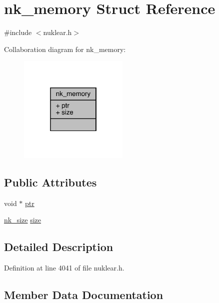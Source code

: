 \hypertarget{structnk__memory}{}\section{nk\+\_\+memory Struct Reference}
\label{structnk__memory}


{\ttfamily \#include $<$nuklear.\+h$>$}



Collaboration diagram for nk\+\_\+memory\+:
\nopagebreak
\begin{figure}[H]
\begin{center}
\leavevmode
\includegraphics[width=148pt]{structnk__memory__coll__graph}
\end{center}
\end{figure}
\subsection*{Public Attributes}
\begin{DoxyCompactItemize}
\item 
void $\ast$ \mbox{\hyperlink{structnk__memory_a844a5bebb33c6e11678e4e1ad5a9762c}{ptr}}
\item 
\mbox{\hyperlink{nuklear_8h_a84c0fc50dec5501be327b33d41d9010c}{nk\+\_\+size}} \mbox{\hyperlink{structnk__memory_a02e6260408d501c5c06c6a73189b5e23}{size}}
\end{DoxyCompactItemize}


\subsection{Detailed Description}


Definition at line 4041 of file nuklear.\+h.



\subsection{Member Data Documentation}
\mbox{\label{structnk__memory_a844a5bebb33c6e11678e4e1ad5a9762c}} 
